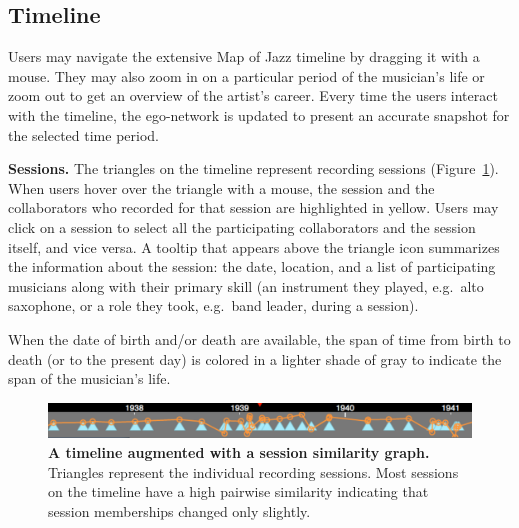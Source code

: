 \documentclass[12pt]{cmuthesis}
\begin{document}

  \subsection{Timeline}

  Users may navigate the extensive Map of Jazz timeline by dragging it with a
  mouse. They may also zoom in on a particular period of the musician's life or
  zoom out to get an overview of the artist's career. Every time the users
  interact with the timeline, the ego-network is updated to present an accurate
  snapshot for the selected time period.

  \textbf{Sessions.} The triangles on the timeline represent recording sessions (Figure~\ref{fig:moj:timeline}). When users hover over the triangle with a mouse, the session and the collaborators who recorded for that session are highlighted in yellow. Users may click on a session to select all the participating collaborators and the session itself, and vice versa. A tooltip that appears above the triangle icon summarizes the information about the session: the date, location, and a list of participating musicians along with their primary skill (an instrument they played, e.g.~alto saxophone, or a role they took, e.g.~band leader, during a session).

  When the date of birth and/or death are available, the span of time from birth to death (or to the present day) is colored in a lighter shade of gray to indicate the span of the musician's life.


  \begin{figure}[ht]
    \includegraphics[width=\linewidth]{figures/timeline}
    \caption{\textbf{A timeline augmented with a session similarity graph.} Triangles represent the individual recording sessions. Most sessions on the timeline have a high pairwise similarity indicating that session memberships changed only slightly.}
    \label{fig:moj:timeline}
  \end{figure}
\end{document}
